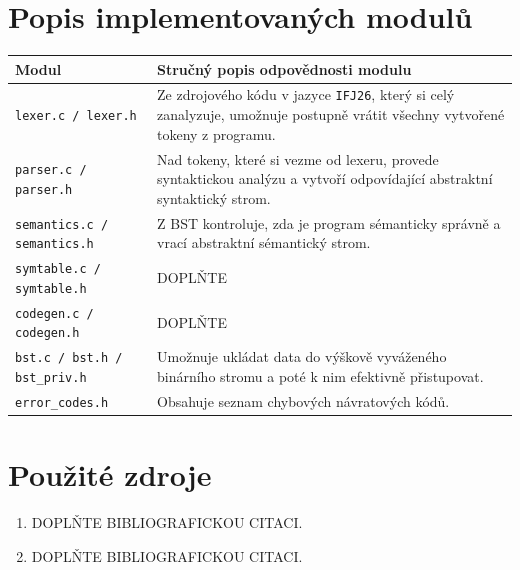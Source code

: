 \documentclass[10pt,a4paper]{article}
\begin{document}
\section{Popis implementovaných modulů}

\begin{longtable}{p{}p{}}
    \toprule
    \textbf{Modul} & \textbf{Stručný popis odpovědnosti modulu} \\
    \midrule
     \texttt{lexer.c / lexer.h} & Ze zdrojového kódu v jazyce \texttt{IFJ26}, který si celý zanalyzuje, umožnuje postupně vrátit všechny vytvořené tokeny z programu.  \\
     \texttt{parser.c / parser.h} & Nad tokeny, které si vezme od lexeru, provede syntaktickou analýzu a vytvoří odpovídající abstraktní syntaktický strom. \\
     \texttt{semantics.c / semantics.h} & Z BST kontroluje, zda je program sémanticky správně a vrací abstraktní sémantický strom.\\
     \texttt{symtable.c / symtable.h} & DOPLŇTE \\
     \texttt{codegen.c / codegen.h} & DOPLŇTE \\
     \texttt{bst.c / bst.h / bst\_priv.h} & Umožnuje ukládat data do výškově vyváženého binárního stromu a poté k nim efektivně přistupovat. \\
    \texttt{error\_codes.h} & Obsahuje seznam chybových návratových kódů. \\
     
    \bottomrule
\end{longtable}

\section{Použité zdroje}

\begin{enumerate}
    \item DOPLŇTE BIBLIOGRAFICKOU CITACI.
    \item DOPLŇTE BIBLIOGRAFICKOU CITACI.
\end{enumerate}
\end{document}
